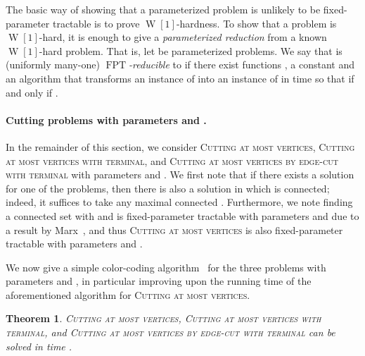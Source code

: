 \documentclass[a4paper,11pt]{article}
\newtheorem{theorem}{Theorem}
\theoremstyle{definition}
\theoremstyle{remark}
\DeclareMathOperator{\operatorClassFPT}{FPT}
\newcommand{\classFPT}{\ensuremath{\operatorClassFPT}}
\DeclareMathOperator{\operatorClassW}{W}
\newcommand{\classW}[1]{\ensuremath{\operatorClassW[#1]}}
\begin{document}
The basic way of showing that a parameterized problem is unlikely to be fixed-parameter tractable is to prove \classW{1}-hardness. To show that a problem is \classW{1}-hard, it is enough to give a \emph{parameterized reduction} from a known \classW{1}-hard problem.
That is, let  be parameterized problems. We say that  is (uniformly many-one) {\em \classFPT{}-reducible} to  if there exist functions
, a constant  and
 an algorithm  that transforms an instance  of  into an instance  of 
in time  so that  if and only if .


\paragraph{Cutting problems with parameters  and .} In the remainder of this section, we consider \textsc{Cutting at most   vertices}, \textsc{Cutting at most  vertices with terminal}, and \textsc{Cutting at most   vertices by edge-cut with terminal} with parameters  and . We first note that if there exists a solution for one of the problems, then
there is also a solution in which  is connected; 
indeed, it suffices to take any maximal connected . Furthermore, we note finding a connected set  with  and  is fixed-parameter tractable with parameters  and  due to a result by Marx~\cite[Theorem 13]{marx2006parameterized}, and thus 
\textsc{Cutting at most  vertices} is also fixed-parameter tractable with parameters  and .

We now give a simple color-coding algorithm~\cite{AlonYZ95,cai2006random} for the three problems with parameters  and , in particular improving upon the running time of the aforementioned algorithm for \textsc{Cutting at most   vertices}.

\begin{theorem}\label{thm:svc_fpt_kt}
\textsc{Cutting at most   vertices}, \textsc{Cutting at most  vertices with terminal}, and \textsc{Cutting at most   vertices by edge-cut with terminal} can be solved in time .
\end{theorem}
\end{document}
